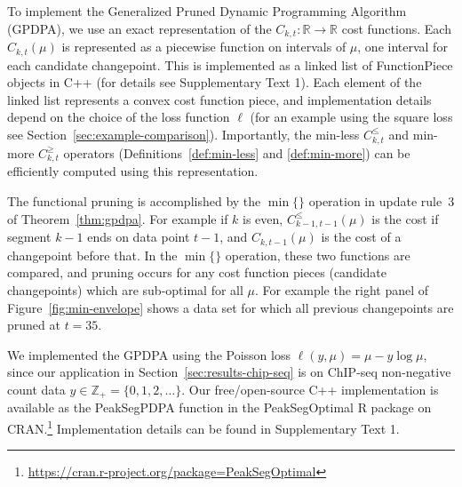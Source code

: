 \documentclass[twoside,11pt]{article}
\newcommand{\ZZ}{\mathbb Z}
\newcommand{\RR}{\mathbb R}
\begin{document}
To implement the Generalized Pruned Dynamic Programming Algorithm
(GPDPA), we use an exact representation of the
$C_{k,t}:\RR\rightarrow\RR$ cost functions. Each $C_{k,t}(\mu)$ is
represented as a piecewise function on intervals of $\mu$, one
interval for each candidate changepoint. This is implemented as a
linked list of FunctionPiece objects in C++ (for details see
Supplementary Text 1). Each element of the linked list represents a
convex cost function piece, and implementation details depend on the
choice of the loss function $\ell$ (for an example using the square
loss see Section~\ref{sec:example-comparison}). Importantly, the
min-less $C_{k,t}^\leq$ and min-more $C_{k,t}^\geq$ operators (Definitions~\ref{def:min-less} and \ref{def:min-more}) can be efficiently computed using this
representation.


The functional pruning is accomplished by the
$\min\{\}$ operation in update rule~3 of Theorem~\ref{thm:gpdpa}. For example if $k$ is even, $C_{k-1,t-1}^\leq(\mu)$ is the cost if segment $k-1$
ends on data point $t-1$, and $C_{k,t-1}(\mu)$ is the cost of a
changepoint before that. In the $\min\{\}$ operation, these two
functions are compared, and pruning occurs for any cost function
pieces (candidate changepoints) which are sub-optimal for all $\mu$.
For example the right panel of Figure~\ref{fig:min-envelope} shows a
data set for which all previous changepoints are pruned at $t=35$.

We implemented the GPDPA using the Poisson loss
$\ell(y, \mu) = \mu - y\log \mu$, since our application in
Section~\ref{sec:results-chip-seq} is on ChIP-seq non-negative count data
$y\in\ZZ_+ = \{0, 1, 2, \dots\}$.
Our free/open-source C++ implementation is
available as the PeakSegPDPA function in the PeakSegOptimal R package
on
CRAN.\footnote{\url{https://cran.r-project.org/package=PeakSegOptimal}}
Implementation details can be found in Supplementary Text 1.
\end{document}
